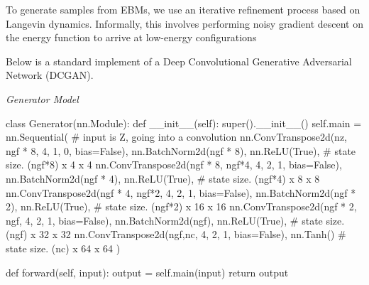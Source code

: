 \documentclass{article}
\begin{document}
To generate samples from EBMs, we use an iterative refinement process based on Langevin dynamics. Informally, this involves performing noisy gradient descent on the energy function to arrive at low-energy configurations

Below is a standard implement of a Deep Convolutional Generative Adversarial Network (DCGAN).

\begin{minipage}{\textwidth}
\vspace{8pt}
\emph{Generator Model}
\vspace{8pt}
\begin{ipythonnb}
class Generator(nn.Module):
    def __init__(self):
        super().__init__()
        self.main = nn.Sequential(
            # input is Z, going into a convolution
            nn.ConvTranspose2d(nz, ngf * 8, 4, 1, 0, bias=False),
            nn.BatchNorm2d(ngf * 8),
            nn.ReLU(True),
            # state size. (ngf*8) x 4 x 4
            nn.ConvTranspose2d(ngf * 8, ngf*4, 4, 2, 1, bias=False),
            nn.BatchNorm2d(ngf * 4),
            nn.ReLU(True),
            # state size. (ngf*4) x 8 x 8
            nn.ConvTranspose2d(ngf * 4, ngf*2, 4, 2, 1, bias=False),
            nn.BatchNorm2d(ngf * 2),
            nn.ReLU(True),
            # state size. (ngf*2) x 16 x 16
            nn.ConvTranspose2d(ngf * 2, ngf, 4, 2, 1, bias=False),
            nn.BatchNorm2d(ngf),
            nn.ReLU(True),
            # state size. (ngf) x 32 x 32
            nn.ConvTranspose2d(ngf,nc, 4, 2, 1, bias=False),
            nn.Tanh()
            # state size. (nc) x 64 x 64
        )

    def forward(self, input):
        output = self.main(input)
        return output
\end{ipythonnb}
\end{minipage}
\end{document}

